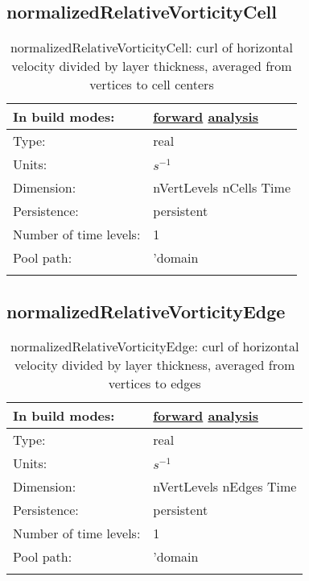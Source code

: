 \subsection[normalizedRelativeVorticityCell]{normalizedRelativeVorticityCell}
\label{subsec:var_sec_diagnostics_normalizedRelativeVorticityCell}
\begin{center}
\begin{longtable}{| p{2.0in} | p{4.0in} |}
        \hline 
        In build modes: & \hyperref[subsec:forward_var_tab_diagnostics]{forward} \hyperref[subsec:analysis_var_tab_diagnostics]{analysis} \\
        \hline 
        Type: & real \\
        \hline 
        Units: & $s^{-1}$ \\
        \hline 
        Dimension: & nVertLevels nCells Time \\
        \hline 
        Persistence: & persistent \\
        \hline 
        Number of time levels: & 1 \\
        \hline 
            Pool path: & 'domain %
 \\
		 \hline 
    \caption{normalizedRelativeVorticityCell: curl of horizontal velocity divided by layer thickness, averaged from vertices to cell centers}
\end{longtable}
\end{center}
\subsection[normalizedRelativeVorticityEdge]{normalizedRelativeVorticityEdge}
\label{subsec:var_sec_diagnostics_normalizedRelativeVorticityEdge}
\begin{center}
\begin{longtable}{| p{2.0in} | p{4.0in} |}
        \hline 
        In build modes: & \hyperref[subsec:forward_var_tab_diagnostics]{forward} \hyperref[subsec:analysis_var_tab_diagnostics]{analysis} \\
        \hline 
        Type: & real \\
        \hline 
        Units: & $s^{-1}$ \\
        \hline 
        Dimension: & nVertLevels nEdges Time \\
        \hline 
        Persistence: & persistent \\
        \hline 
        Number of time levels: & 1 \\
        \hline 
            Pool path: & 'domain %
 \\
		 \hline 
    \caption{normalizedRelativeVorticityEdge: curl of horizontal velocity divided by layer thickness, averaged from vertices to edges}
\end{longtable}
\end{center}
